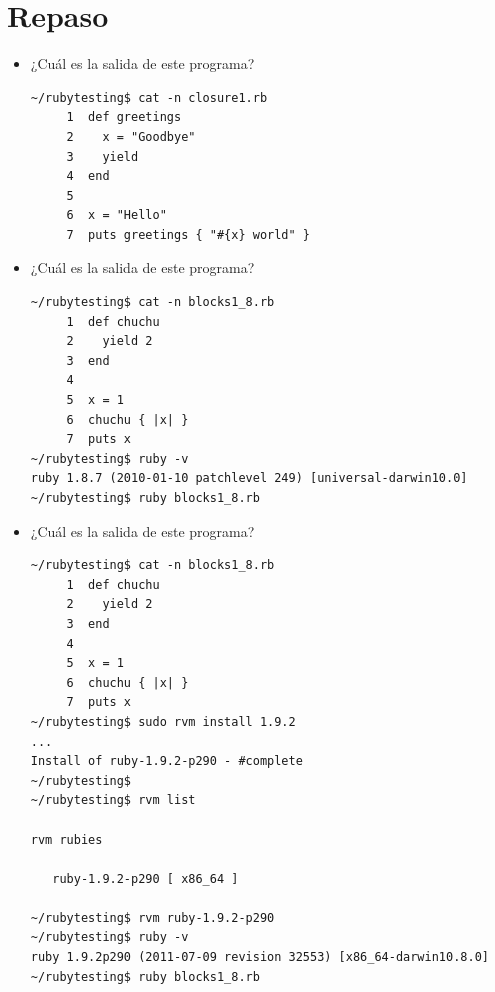 \section{Repaso}

\begin{itemize}
\item ¿Cuál es la salida de este programa?
\begin{verbatim}
~/rubytesting$ cat -n closure1.rb 
     1  def greetings
     2    x = "Goodbye"
     3    yield 
     4  end
     5  
     6  x = "Hello"
     7  puts greetings { "#{x} world" }
\end{verbatim}
\item ¿Cuál es la salida de este programa?
\begin{verbatim}
~/rubytesting$ cat -n blocks1_8.rb 
     1  def chuchu
     2    yield 2
     3  end
     4  
     5  x = 1
     6  chuchu { |x| }
     7  puts x
~/rubytesting$ ruby -v
ruby 1.8.7 (2010-01-10 patchlevel 249) [universal-darwin10.0]
~/rubytesting$ ruby blocks1_8.rb 

\end{verbatim}
\item ¿Cuál es la salida de este programa?
\begin{verbatim}
~/rubytesting$ cat -n blocks1_8.rb 
     1  def chuchu
     2    yield 2
     3  end
     4  
     5  x = 1
     6  chuchu { |x| }
     7  puts x
~/rubytesting$ sudo rvm install 1.9.2
...
Install of ruby-1.9.2-p290 - #complete 
~/rubytesting$  
~/rubytesting$ rvm list

rvm rubies

   ruby-1.9.2-p290 [ x86_64 ]

~/rubytesting$ rvm ruby-1.9.2-p290
~/rubytesting$ ruby -v
ruby 1.9.2p290 (2011-07-09 revision 32553) [x86_64-darwin10.8.0]
~/rubytesting$ ruby blocks1_8.rb 


\end{verbatim}
\end{itemize}
